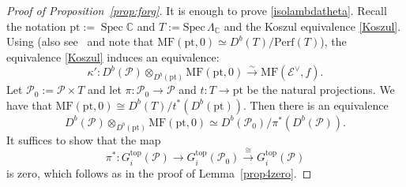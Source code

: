 \documentclass [11pt,oneside,a4paper,mathscr]{amsart}
\theoremstyle{definition}
\newcommand{\Spec}{\operatorname{Spec}}
\begin{document}
\begin{proof}[Proof of Proposition~\ref{prop:forg}]
    It is enough to prove \eqref{isolambdatheta}. 
    Recall the notation $\mathrm{pt}:=\Spec \mathbb{C}$ and $T:=\mathrm{Spec}\,\Lambda_{\mathbb{C}}$ and the Koszul equivalence \eqref{Koszul}. Using \cite[Proposition 3.24]{HLP}
    (also see~\cite[Proposition~3.9]{T4} and note that 
    $\mathrm{MF}(\mathrm{pt}, 0)\simeq D^b(T)/\mathrm{Perf}(T)$), the equivalence \eqref{Koszul} induces an equivalence:
    \[\kappa'\colon D^b(\mathscr{P})\otimes_{D^b(\mathrm{pt})}\mathrm{MF}(\mathrm{pt}, 0)\xrightarrow{\sim} \mathrm{MF}(\mathscr{E}^\vee, f).\]
       Let $\mathscr{P}_0:=\mathscr{P}\times T$ and let $\pi\colon \mathscr{P}_0\to\mathscr{P}$ and $t\colon T\to \mathrm{pt}$ be the natural projections. We have that $\mathrm{MF}(\mathrm{pt}, 0)\cong D^b(T)/t^*(D^b(\mathrm{pt}))$. Then 
       there is an equivalence
    \[D^b(\mathscr{P})\otimes_{D^b(\mathrm{pt})}\mathrm{MF}(\mathrm{pt}, 0)\simeq D^b(\mathscr{P}_0)/\pi^*(D^b(\mathscr{P})).\] It suffices to show that the map 
    \[\pi^*\colon G^{\mathrm{top}}_i(\mathscr{P})\to G^{\mathrm{top}}_i(\mathscr{P}_0)\stackrel{\cong}{\to} G^{\mathrm{top}}_i(\mathscr{P})\] is zero, which follows as in the proof of Lemma~\ref{prop4zero}. 
\end{proof}
\end{document}
